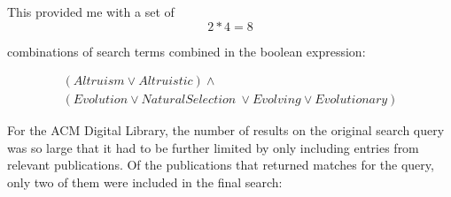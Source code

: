 \documentclass[a4paper]{book}
\begin{document}
This provided me with a set of 
\begin{equation}
\label{eq:comb2}
2*4 = 8 
\end{equation}








combinations of search terms combined in the boolean expression:

\begin{center}
\begin{multline}
\label{eq:search2}
(Altruism \lor Altruistic ) \land \\
(Evolution \lor Natural Selection\ \lor Evolving \lor Evolutionary)
\end{multline}
 \end{center}

For the ACM Digital Library, the number of results on the original search query
was so large that it had to be further limited by only including entries from 
relevant publications. Of the publications that returned matches for the query,
only two of them were included in the final search:
\end{document}
